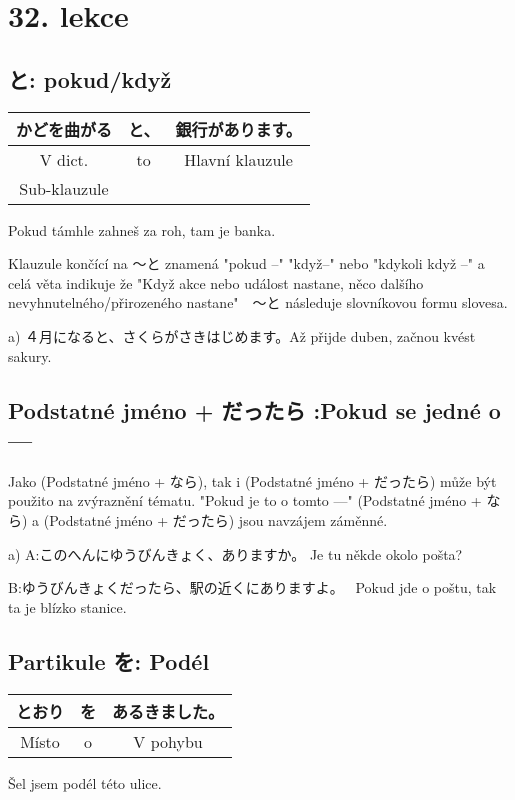 
\section{32. lekce}
\label{sec:lekce_32}

\subsection{と: pokud/když}
\begin{center}
\begin{tabular}{||c|c||c||}
\hline
かどを曲がる&と、&銀行があります。\\
\hline
V dict.& to& Hlavní klauzule\\
\hline
Sub-klauzule&&\\
\hline
\end{tabular}
\end{center}
Pokud támhle zahneš za roh, tam je banka.

Klauzule končící na 〜と znamená "pokud --" "když--" nebo "kdykoli když --" a celá věta indikuje že "Když akce nebo událost nastane, něco dalšího nevyhnutelného/přirozeného nastane"　〜と následuje slovníkovou formu slovesa.

a) ４月になると、さくらがさきはじめます。Až přijde duben, začnou kvést sakury.

\subsection{Podstatné jméno +  だったら :Pokud se jedné o --- }

Jako (Podstatné jméno + なら), tak i (Podstatné jméno + だったら) může být použito na zvýraznění tématu. "Pokud je to o tomto ---"  (Podstatné jméno + なら) a (Podstatné jméno + だったら) jsou navzájem záměnné.

a) 
A:このへんにゆうびんきょく、ありますか。 Je tu někde okolo pošta?

B:ゆうびんきょくだったら、駅の近くにありますよ。　 Pokud jde o poštu, tak ta je blízko stanice.






\subsection{Partikule を: Podél}
\begin{center}
\begin{tabular}{||c|c||c||}
\hline
とおり&を&あるきました。\\
\hline
Místo& o& V pohybu\\
\hline
\end{tabular}
\end{center}
Šel jsem podél této ulice.

